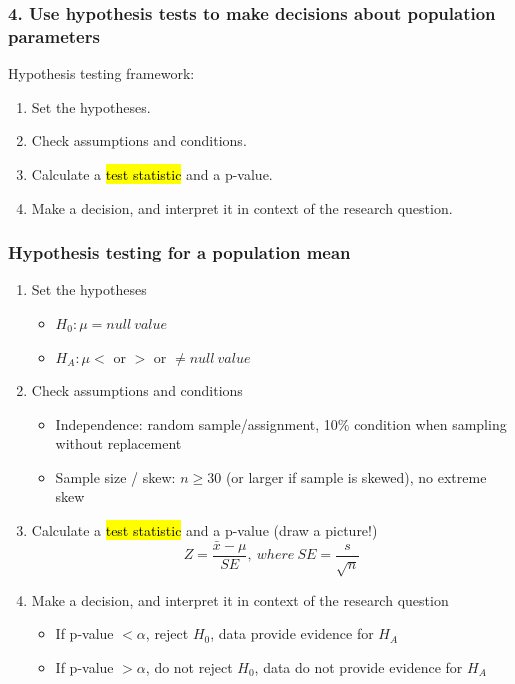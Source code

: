 \documentclass[slidestop,compress,mathserif,12pt,t,professionalfonts,xcolor=table]{beamer}
\begin{document}
\begin{frame}
\frametitle{4. Use hypothesis tests to make decisions about population parameters}

Hypothesis testing framework:

\begin{enumerate}

\item Set the hypotheses.

\item Check assumptions and conditions.

\item Calculate a \hl{test statistic} and a p-value.

\item Make a decision, and interpret it in context of the research question.

\end{enumerate}

\end{frame}


\begin{frame}
\frametitle{Hypothesis testing for a population mean}

\begin{enumerate}

\item Set the hypotheses
\begin{itemize}
\item $H_0: \mu = null~value$
\item $H_A: \mu <$ or $>$ or $\ne null~value$
\end{itemize}

\pause

\item Check assumptions and conditions
\begin{itemize}
\item Independence: random sample/assignment, 10\% condition when sampling without replacement
\item Sample size / skew: $n \ge 30$ (or larger if sample is skewed), no extreme skew
\end{itemize}

\pause

\item Calculate a \hl{test statistic} and a p-value (draw a picture!)
\[ Z = \frac{\bar{x} - \mu}{SE},~where~SE = \frac{s}{\sqrt{n}} \]

\pause

\item Make a decision, and interpret it in context of the research question
\begin{itemize}
\item If p-value $< \alpha$, reject $H_0$, data provide evidence for $H_A$
\item If p-value $> \alpha$, do not reject $H_0$, data do not provide evidence for $H_A$
\end{itemize}

\end{enumerate}

\end{frame}
\end{document}
